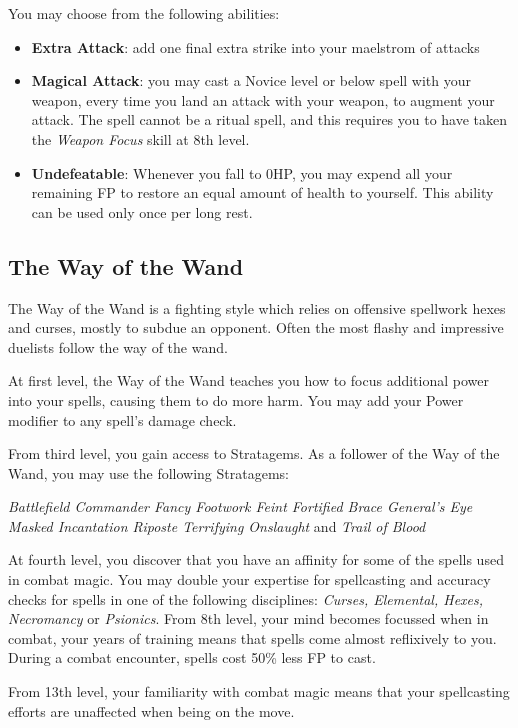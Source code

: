 {{You may choose from the following abilities:
\begin{itemize}
	\item {\bf Extra Attack}: add one final extra strike into your maelstrom of attacks
	\item {\bf Magical Attack}: you may cast a Novice level or below spell with your weapon, every time you land an attack with your weapon, to augment your attack. The spell cannot be a ritual spell, and this requires you to have taken the {\it Weapon Focus} skill at 8th level. 
	\item {\bf Undefeatable}: Whenever you fall to 0HP, you may expend all your remaining FP to restore an equal amount of health to yourself. This ability can be used only once per long rest.
\end{itemize}
}

\newpage
\subsection{\bf The Way of the Wand}

The Way of the Wand is a fighting style which relies on offensive spellwork \minus{} hexes and curses, mostly  \minus{} to subdue an opponent. Often the most flashy and impressive duelists follow the way of the wand. 

{
	At first level, the Way of the Wand teaches you how to focus additional power into your spells, causing them to do more harm. You may add your Power modifier to any spell's damage check.   
}



From third level, you gain access to Stratagems. As a follower of the Way of the Wand, you may use the following Stratagems:

{\it
Battlefield Commander\comma{} Fancy Footwork\comma{} Feint\comma{} Fortified Brace\comma{} General’s Eye\comma{} Masked Incantation\comma{} Riposte\comma{} Terrifying Onslaught } and {\it Trail of Blood
}

{
	At fourth level, you discover that you have an affinity for some of the spells used in combat magic.  You may double your expertise for spellcasting and accuracy checks for spells in one of the following disciplines: {\it  Curses, Elemental, Hexes, Necromancy} or {\it Psionics}. 
}
{
	From 8th level, your mind becomes focussed when in combat, your years of training means that spells come almost reflixively to you. 
	During a combat encounter, spells cost 50\% less FP to cast. 
}
{
	From 13th level, your familiarity with combat magic means that your spellcasting efforts are unaffected when being on the move. 
	
}}
